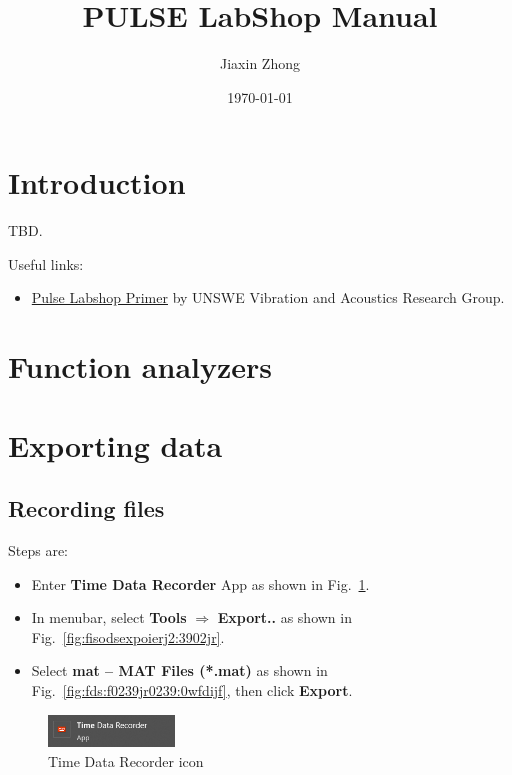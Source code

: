 \documentclass{article}
\title{\textbf{PULSE LabShop Manual}}
\author{Jiaxin Zhong}
\date{\today}
\begin{document}
\maketitle
\thispagestyle{firststyle}
\tableofcontents

\section{Introduction}
TBD.

Useful links:
\begin{itemize}
    \item \href{http://www.varg.unsw.edu.au/Assets/link%20pdfs/Pulse%20Labshop%20Primer%20Rev%202.pdf}{Pulse Labshop Primer} by UNSWE Vibration and Acoustics Research Group.
\end{itemize}

\section{Function analyzers}
\section{Exporting data }
\subsection{Recording files}
Steps are:
\begin{itemize}
    \item Enter \textbf{Time Data Recorder} App as shown in Fig.~\ref{fig:timedatadfjiowerfj3}.
    \item In menubar, select \textbf{Tools} $\Longrightarrow$ \textbf{Export..} as shown in Fig.~\ref{fig:fisodsexpoierj2:3902jr}.
    \item Select \textbf{mat -- MAT Files (*.mat)} as shown in Fig.~\ref{fig:fds:f0239jr0239:0wfdijf}, then click \textbf{Export}.
\end{itemize}
\begin{figure}[!htb]
    \centering
    \includegraphics[width = 0.3\textwidth]{fig/TimeDataRecorder_20230301100611.png}
    \caption{Time Data Recorder icon}
    \label{fig:timedatadfjiowerfj3}
\end{figure}
\end{document}
